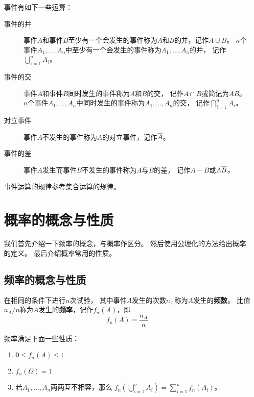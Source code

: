 \begin{definition}[事件的运算]
  事件有如下一些运算：
  \begin{description}
    \item[事件的并]
    事件$A$和事件$B$至少有一个会发生的事件称为$A$和$B$的并，记作$A\cup B$。
    $n$个事件$A_1,\dots,A_n$中至少有一个会发生的事件称为$A_1,\dots,A_n$的并，
    记作$\bigcup_{i=1}^n A_i$。
    \item[事件的交]
    事件$A$和事件$B$同时发生的事件称为$A$和$B$的交，
    记作$A\cap B$或简记为$AB$。
    $n$个事件$A_1,\dots,A_n$中同时发生的事件称为$A_1,\dots,A_n$的交，
    记作$\bigcap_{i=1}^n A_i$。
    \item[对立事件]
    事件$A$不发生的事件称为$A$的对立事件，记作$\overline{A}$。
    \item[事件的差]
    事件$A$发生而事件$B$不发生的事件称为$A$与$B$的差，
    记作$A-B$或$A\overline{B}$。
  \end{description}
\end{definition}

事件运算的规律参考集合运算的规律。

\section{概率的概念与性质}
我们首先介绍一下频率的概念，与概率作区分。
然后使用公理化的方法给出概率的定义。
最后介绍概率常用的性质。

\subsection{频率的概念与性质}
\begin{definition}[频率]
  在相同的条件下进行$n$次试验，
  其中事件$A$发生的次数$n_A$称为$A$发生的\textbf{频数}。
  比值$n_A/n$称为$A$发生的\textbf{频率}，记作$f_n(A)$，即
  \[ f_n(A) = \frac{n_A}{n} \]
\end{definition}

\begin{theorem}[频率的性质]
  频率满足下面一些性质：
  \begin{enumerate}
    \item
    $0 \le f_n(A) \le 1$
    \item
    $f_n(\Omega) = 1$
    \item
    若$A_1,\dots,A_n$两两互不相容，那么
    $f_n\left(\bigcup_{i=1}^n A_i\right) = \sum_{i=1}^n f_n(A_i)$。
  \end{enumerate}
\end{theorem}

